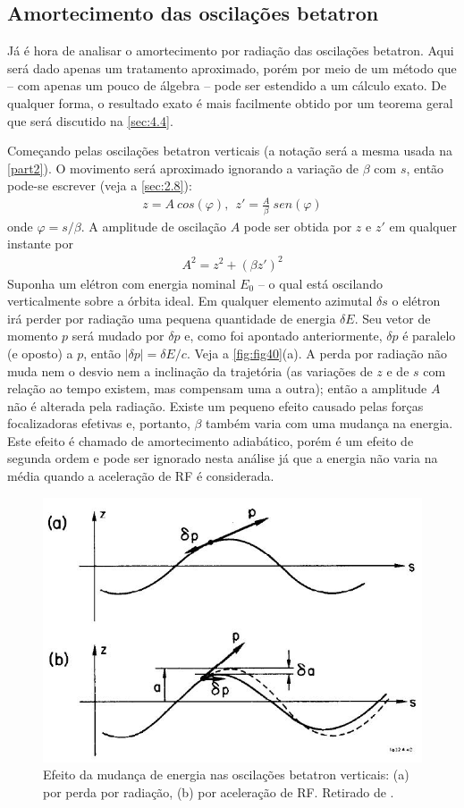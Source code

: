 \subsection{Amortecimento das oscilações betatron}\label{sec:4.3}
Já é hora de analisar o amortecimento por radiação das oscilações betatron. Aqui será dado apenas um tratamento aproximado, porém por meio de um método que -- com apenas um pouco de álgebra -- pode ser estendido a um cálculo exato. De qualquer forma, o resultado exato é mais facilmente obtido por um teorema geral que será discutido na \autoref{sec:4.4}.

Começando pelas oscilações betatron verticais (a notação será a mesma usada na \autoref{part2}). O movimento será aproximado ignorando a variação de $\beta$ com $s$, então pode-se escrever (veja a \autoref{sec:2.8}):
\begin{align}
	z = A\ cos(\varphi), \ \ z' = \frac{A}{\beta}\ sen(\varphi)\label{eq:4.24}
\end{align}
onde $\varphi = s/\beta$. A amplitude de oscilação $A$ pode ser obtida por $z$ e $z'$ em qualquer instante por
\begin{align}
	A^2 = z^2 + (\beta z')^2
\end{align}
Suponha um elétron com energia nominal $E_0$ -- o qual está oscilando verticalmente sobre a órbita ideal. Em qualquer elemento azimutal $\delta s$ o elétron irá perder por radiação uma pequena quantidade de energia $\delta E$. Seu vetor de momento $p$ será mudado por $\delta p$ e, como foi apontado anteriormente, $\delta p$ é paralelo (e oposto) a $p$, então $|\delta p| = \delta E/c$. Veja a \autoref{fig:fig40}(a). A perda por radiação não muda nem o desvio nem a inclinação da trajetória (as variações de $z$ e de $s$ com relação ao tempo existem, mas compensam uma a outra); então a amplitude $A$ não é alterada pela radiação. Existe um pequeno efeito causado pelas forças focalizadoras efetivas e, portanto, $\beta$ também varia com uma mudança na energia. Este efeito é chamado de amortecimento adiabático, porém é um efeito de segunda ordem e pode ser ignorado nesta análise já que a energia não varia na média quando a aceleração de RF é considerada.

\begin{figure}[!htb]
	\centering
	\includegraphics[width=0.7\linewidth]{./Figuras/fig40.jpeg}
	\caption{Efeito da mudança de energia nas oscilações betatron verticais: (a) por perda por radiação, (b) por aceleração de RF. Retirado de \cite{sands1970physics}.}
	\label{fig:fig40}
\end{figure}

